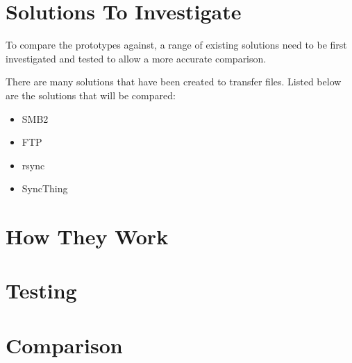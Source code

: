 \section{Solutions To Investigate}
To compare the prototypes against, a range of existing solutions need to be first investigated and tested to allow a more accurate comparison.

There are many solutions that have been created to transfer files. Listed below are the solutions that will be compared:

\begin{itemize}
	\item SMB2
    \item FTP
	\item rsync
	\item SyncThing
\end{itemize}


\section{How They Work}
\section{Testing}
\section{Comparison}
